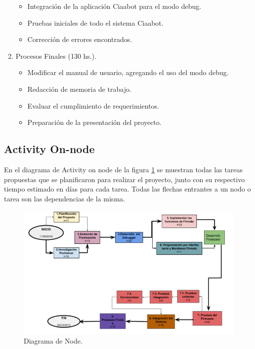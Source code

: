 \begin{enumerate}
	\begin{itemize}
		\item Integración de la aplicación Ciaabot para el modo debug.
		\item Pruebas iniciales de todo el sistema Ciaabot.
		\item Corrección de errores encontrados.
	\end{itemize}

	\item Procesos Finales (130 hs.).
	
	\begin{itemize}
		\item Modificar el manual de usuario, agregando el uso del modo debug.
		\item Redacción de memoria de trabajo.
		\item Evaluar el cumplimiento de requerimientos.
		\item Preparación de la presentación del proyecto.
	\end{itemize}

\end{enumerate}

\subsection{Activity On-node} 

En el diagrama de Activity on node de la figura  \ref{fig:diagramaNode} se muestran todas las tareas propuestas que se planificaron para realizar el proyecto, junto con su respectivo tiempo estimado en días para cada tarea.
Todas las flechas entrantes a un nodo o tarea son las dependencias de la misma.
 

\begin{figure}[h]
	\centering
	\includegraphics[scale=.80]{./Figures/diagramaNode.png}
	\caption{Diagrama de Node.}
	\label{fig:diagramaNode}
\end{figure}

